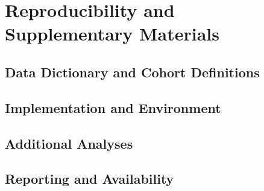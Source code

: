 \chapter{Reproducibility and Supplementary Materials}
\label{app:reproducibility}

\section{Data Dictionary and Cohort Definitions}

\section{Implementation and Environment}

\section{Additional Analyses}

\section{Reporting and Availability}
